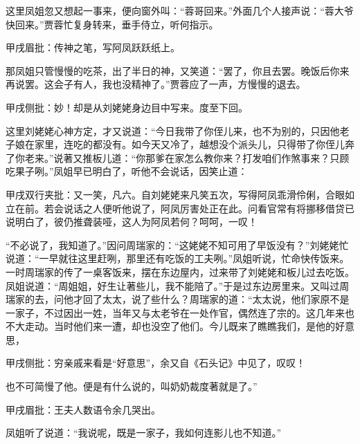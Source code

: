 \begin{parag}
    这里凤姐忽又想起一事来，便向窗外叫：“蓉哥回来。”外面几个人接声说：“蓉大爷快回来。”贾蓉忙复身转来，垂手侍立，听何指示。\begin{note}甲戌眉批：传神之笔，写阿凤跃跃纸上。\end{note}那凤姐只管慢慢的吃茶，出了半日的神，又笑道：“罢了，你且去罢。晚饭后你来再说罢。这会子有人，我也没精神了。”贾蓉应了一声，方慢慢的退去。\begin{note}甲戌侧批：妙！却是从刘姥姥身边目中写来。度至下回。\end{note}
\end{parag}


\begin{parag}
    这里刘姥姥心神方定，才又说道：“今日我带了你侄儿来，也不为别的，只因他老子娘在家里，连吃的都没有。如今天又冷了，越想没个派头儿，只得带了你侄儿奔了你老来。”说著又推板儿道：“你那爹在家怎么教你来？打发咱们作煞事来？只顾吃果子咧。”凤姐早已明白了，听他不会说话，因笑止道：\begin{note}甲戌双行夹批：又一笑，凡六。自刘姥姥来凡笑五次，写得阿凤乖滑伶俐，合眼如立在前。若会说话之人便听他说了，阿凤厉害处正在此。问看官常有将挪移借贷已说明白了，彼仍推聋装哑，这人为阿凤若何？呵呵，一叹！\end{note}“不必说了，我知道了。”因问周瑞家的：“这姥姥不知可用了早饭没有？”刘姥姥忙说道：“一早就往这里赶咧，那里还有吃饭的工夫咧。”凤姐听说，忙命快传饭来。一时周瑞家的传了一桌客饭来，摆在东边屋内，过来带了刘姥姥和板儿过去吃饭。凤姐说道：“周姐姐，好生让著些儿，我不能陪了。”于是过东边房里来。又叫过周瑞家的去，问他才回了太太，说了些什么？周瑞家的道：“太太说，他们家原不是一家子，不过因出一姓，当年又与太老爷在一处作官，偶然连了宗的。这几年来也不大走动。当时他们来一遭，却也没空了他们。今儿既来了瞧瞧我们，是他的好意思，\begin{note}甲戌侧批：穷亲戚来看是“好意思”，余又自《石头记》中见了，叹叹！\end{note}也不可简慢了他。便是有什么说的，叫奶奶裁度著就是了。”\begin{note}甲戌眉批：王夫人数语令余几哭出。\end{note}凤姐听了说道：“我说呢，既是一家子，我如何连影儿也不知道。”
\end{parag}


